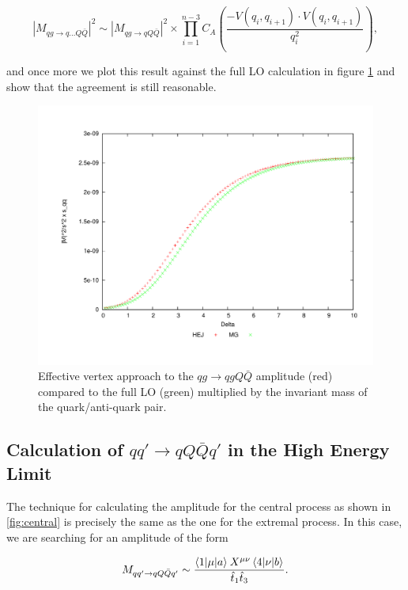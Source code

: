 \begin{equation}
|M_{qg \to q...Q\bar{Q}}|^2 \sim |M_{qg \to qQ\bar{Q}}|^2 \times \prod_{i=1}^{n-3}  C_A \left(\frac{-V(q_i,q_{i+1}) \cdot V(q_i,q_{i+1})}{q_i^2} \right),
\end{equation}

and once more we plot this result against the full LO calculation in figure \ref{fig:qg_qqq_emis} and show that the agreement is still reasonable. 

\begin{figure}[H]
\centering
\includegraphics[scale=0.45]{Images/qg_qgQQx_sqq.pdf}
\caption{Effective vertex approach to the $qg \to qgQ\bar{Q}$ amplitude (red) compared to the full LO (green) multiplied by the invariant mass of the quark/anti-quark pair.}
\label{fig:qg_qqq_emis}
\end{figure}

\subsection{Calculation of $qq' \to qQ\bar{Q}q'$ in the High Energy Limit}

The technique for calculating the amplitude for the central process as shown in \ref{fig:central} is precisely the same as the one for the extremal process. In this case, we are searching for an amplitude of the form

\begin{equation}
M_{qq' \to qQ\bar{Q}q'} \sim \frac{\mathinner{\langle1\vert\mu\vert a\rangle}_{}X^{\mu \nu} \mathinner{\langle4\vert\nu\vert b\rangle}_{}}{\hat{t}_1 \hat{t}_3}.
\end{equation}


